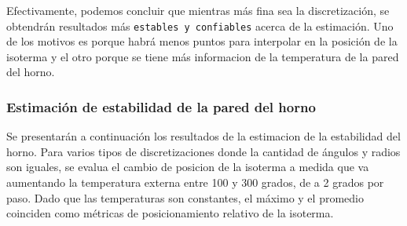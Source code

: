 \vspace{0.5cm}

Efectivamente, podemos concluir que mientras más fina sea la discretización, se obtendrán resultados más \texttt{estables y confiables} acerca de la estimación. Uno de los motivos es porque habrá menos puntos para interpolar en la posición de la isoterma y el otro porque se tiene más informacion de la temperatura de la pared del horno.

\subsubsection{Estimación de estabilidad de la pared del horno}

Se presentarán a continuación los resultados de la estimacion de la estabilidad del horno. Para varios tipos de discretizaciones donde la cantidad de ángulos y radios son iguales, se evalua el cambio de posicion de la isoterma a medida que va aumentando la temperatura externa entre 100 y 300 grados, de a 2 grados por paso. Dado que las temperaturas son constantes, el máximo y el promedio coinciden como métricas de posicionamiento relativo de la isoterma.

